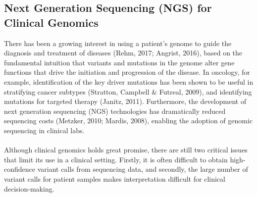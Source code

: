 \documentclass{article}
\begin{document}
\subsection{Next Generation Sequencing (NGS) for Clinical Genomics}
There has been a growing interest in using a patient's genome to guide the diagnosis and treatment of diseases (Rehm, 2017; Angrist, 2016), based on the fundamental intuition that variants and mutations in the genome alter gene functions that drive the initiation and progression of the disease. In oncology, for example, identification of the key driver mutations has been shown to be useful in stratifying cancer subtypes (Stratton, Campbell \& Futreal, 2009), and identifying mutations for targeted therapy (Janitz, 2011). Furthermore, the development of next generation sequencing (NGS) technologies has dramatically reduced sequencing costs (Metzker, 2010; Mardis, 2008), enabling the adoption of genomic sequencing in clinical labs.\\\\ 
Although clinical genomics holds great promise, there are still two critical issues that limit its use in a clinical setting. Firstly, it is often difficult to obtain high-confidence variant calls from sequencing data, and secondly, the large number of variant calls for patient samples makes interpretation difficult for clinical decision-making.
\end{document}
